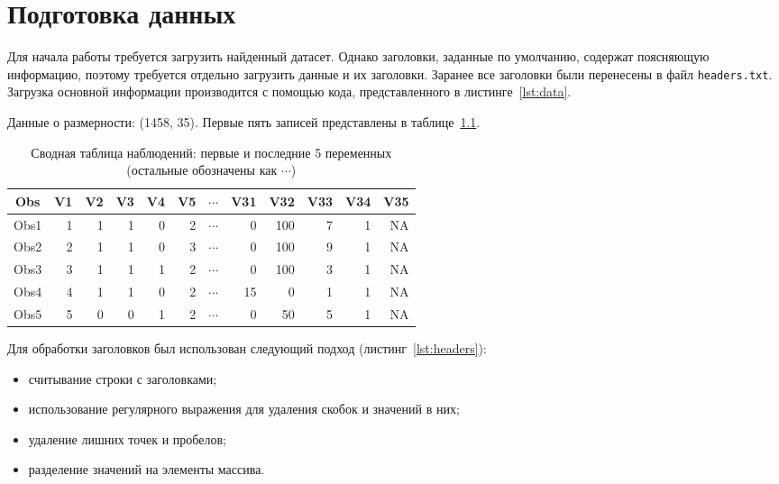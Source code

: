 \chapter{Подготовка данных}



Для начала работы требуется загрузить найденный датасет. Однако заголовки, заданные по умолчанию, содержат поясняющую информацию, поэтому требуется отдельно загрузить данные и их заголовки. Заранее все заголовки были перенесены в файл \texttt{headers.txt}. Загрузка основной информации производится с помощью кода, представленного в листинге~\ref{lst:data}.



Данные о размерности: (1458, 35). Первые пять записей представлены в таблице~\ref{tab:truncated_table}.

\begin{table}[ht]
	\centering
	\caption{Сводная таблица наблюдений: первые и последние 5 переменных (остальные обозначены как $\cdots$)}
	\scriptsize
	\setlength{\tabcolsep}{7pt}
	\begin{tabular}{|c|r r r r r c r r r r r|}
		\hline
		Obs & V1 & V2 & V3 & V4 & V5 & $\cdots$ & V31 & V32 & V33 & V34 & V35 \\
		\hline
		Obs1 & 1 & 1 & 1 & 0 & 2 & $\cdots$ & 0 & 100 & 7 & 1 & NA \\
		Obs2 & 2 & 1 & 1 & 0 & 3 & $\cdots$ & 0 & 100 & 9 & 1 & NA \\
		Obs3 & 3 & 1 & 1 & 1 & 2 & $\cdots$ & 0 & 100 & 3 & 1 & NA \\
		Obs4 & 4 & 1 & 1 & 0 & 2 & $\cdots$ & 15 & 0 & 1 & 1 & NA \\
		Obs5 & 5 & 0 & 0 & 1 & 2 & $\cdots$ & 0 & 50 & 5 & 1 & NA \\
		\hline
	\end{tabular}
	\label{tab:truncated_table}
\end{table}

Для обработки заголовков был использован следующий подход (листинг~\ref{lst:headers}):

\begin{itemize}
	\item считывание строки с заголовками;
	\item использование регулярного выражения для удаления скобок и значений в них;
	\item удаление лишних точек и пробелов;
	\item разделение значений на элементы массива.
\end{itemize}

